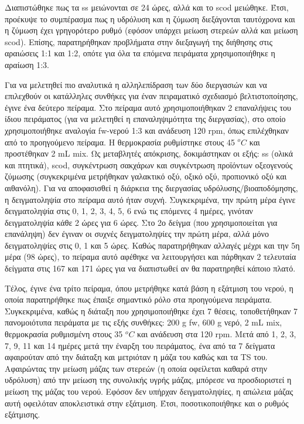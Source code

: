 \documentclass[11pt]{report}
\begin{document}
Διαπιστώθηκε πως τα \acrfull{ss} μειώνονται σε 24 ώρες, αλλά και το \acrshort{scod} μειώθηκε. Έτσι, προέκυψε το συμπέρασμα πως η υδρόλυση και η ζύμωση διεξάγονται ταυτόχρονα και η ζύμωση έχει γρηγορότερο ρυθμό (εφόσον υπάρχει μείωση στερεών αλλά και μείωση \acrshort{scod}). Επίσης, παρατηρήθηκαν προβλήματα στην διεξαγωγή της διήθησης στις αραιώσεις 1:1 και 1:2, οπότε για όλα τα επόμενα πειράματα χρησιμοποιήθηκε η αραίωση 1:3.

Για να μελετηθεί πιο αναλυτικά η αλληλεπίδραση των δύο διεργασιών και να επιλεχθούν οι κατάλληλες συνθήκες για έναν πειραματικό σχεδιασμό βελτιστοποίησης, έγινε ένα δεύτερο πείραμα. Στο πείραμα αυτό χρησιμοποιήθηκαν 2 επαναλήψεις του ίδιου πειράματος (για να μελετηθεί η επαναληψιμότητα της διεργασίας), στο οποίο χρησιμοποιήθηκε αναλογία \acrshort{fw}-νερού 1:3 και ανάδευση 120 rpm, όπως επιλέχθηκαν από το προηγούμενο πείραμα. Η θερμοκρασία ρυθμίστηκε στους 45 \(^oC\) και προστέθηκαν 2 mL \acrshort{mix}. Ως μεταβλητές απόκρισης, δοκιμάστηκαν οι εξής: \acrshort{ss} (ολικά και πτητικά), \acrshort{scod}, συγκέντρωση σακχάρων και συγκέντρωση προϊόντων οξεογενούς ζύμωσης (συγκεκριμένα μετρήθηκαν γαλακτικό οξύ, οξικό οξύ, προπιονικό οξύ και αιθανόλη). Για να αποφασισθεί η διάρκεια της διεργασίας υδρόλυσης/βιοαποδόμησης, η δειγματοληψία στο πείραμα αυτό ήταν συχνή. Συγκεκριμένα, την πρώτη μέρα έγινε δειγματοληψία στις 0, 1, 2, 3, 4, 5, 6 ενώ τις επόμενες 4 ημέρες, γινόταν δειγματοληψία κάθε 2 ώρες για 6 ώρες. Στο 2ο δείγμα (που χρησιμοποιείται για επανάληψη) δεν έγιναν οι συχνές δειγματοληψίες την πρώτη μέρα, αλλά μόνο δειγματοληψίες στις 0, 1 και 5 ώρες. Καθώς παρατηρήθηκαν αλλαγές μέχρι και την 5η μέρα (98 ώρες), το πείραμα αυτό αφέθηκε να λειτουργήσει και πάρθηκαν 2 τελευταία δείγματα στις 167 και 171 ώρες για να διαπιστωθεί αν θα παρατηρηθεί κάποιο πλατό.

Τέλος, έγινε ένα τρίτο πείραμα, όπου μετρήθηκε κατά βάση η εξάτμιση του νερού, η οποία παρατηρήθηκε πως έπαιξε σημαντικό ρόλο στα προηγούμενα πειράματα. Συγκεκριμένα, καθώς η διάταξη που χρησιμοποιήθηκε έχει 7 θέσεις, τοποθετήθηκαν 7 πανομοιότυπα πειράματα με τις εξής συνθήκες: 200 g \acrshort{fw}, 600 g νερό, 2 mL \acrshort{mix}, θερμοκρασία ρυθμισμένη στους 35 \(^oC\) και ανάδευση στα 120 rpm. Μετά από 1, 2, 3, 7, 9, 11 και 14 ημέρες μετά την έναρξη του πειράματος, ένα από τα 7 δείγματα αφαιρούταν από την διάταξη και μετριόταν η μάζα του καθώς και τα TS του. Αφαιρώντας την μείωση μάζας των στερεών (η οποία οφείλεται καθαρά στην υδρόλυση) από την μείωση της συνολικής υγρής μάζας, μπόρεσε να προσδιοριστεί η μείωση της μάζας του νερού. Εφόσον δεν υπήρχαν δειγματοληψίες, η απώλεια μάζας αυτή οφειλόταν αποκλειστικά στην εξάτμιση. Έτσι, ποσοτικοποιήθηκε και ο ρυθμός εξάτμισης.
\end{document}
